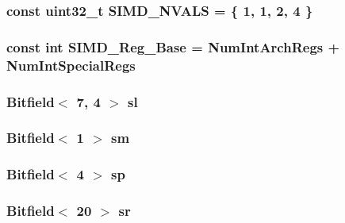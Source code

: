 \label{namespaceMipsISA_ac6d349533fc98005c8ccf294db7b8033}
\hypertarget{namespaceMipsISA_a82c0828e33920777f7db2e172869fb4f}{
\subsubsection[{SIMD\_\-NVALS}]{\setlength{\rightskip}{0pt plus 5cm}const {\bf uint32\_\-t} {\bf SIMD\_\-NVALS} = \{ 1, 1, 2, 4 \}}}
\label{namespaceMipsISA_a82c0828e33920777f7db2e172869fb4f}
\hypertarget{namespaceMipsISA_aca56f2249a1261d2059a1197683c68db}{
\subsubsection[{SIMD\_\-Reg\_\-Base}]{\setlength{\rightskip}{0pt plus 5cm}const int {\bf SIMD\_\-Reg\_\-Base} = {\bf NumIntArchRegs} + {\bf NumIntSpecialRegs}}}
\label{namespaceMipsISA_aca56f2249a1261d2059a1197683c68db}
\hypertarget{namespaceMipsISA_a1c270fe7d427d315732ce89065669af0}{
\subsubsection[{sl}]{\setlength{\rightskip}{0pt plus 5cm}Bitfield$<$ 7, 4 $>$ {\bf sl}}}
\label{namespaceMipsISA_a1c270fe7d427d315732ce89065669af0}
\hypertarget{namespaceMipsISA_a54c7875eaf2634ca9f55701aee2a22e5}{
\subsubsection[{sm}]{\setlength{\rightskip}{0pt plus 5cm}Bitfield$<$ 1 $>$ {\bf sm}}}
\label{namespaceMipsISA_a54c7875eaf2634ca9f55701aee2a22e5}
\hypertarget{namespaceMipsISA_aec732cfc085807a8a81c2534c69cea56}{
\subsubsection[{sp}]{\setlength{\rightskip}{0pt plus 5cm}Bitfield$<$ 4 $>$ {\bf sp}}}
\label{namespaceMipsISA_aec732cfc085807a8a81c2534c69cea56}
\hypertarget{namespaceMipsISA_a1374386b07e211f084f2b05684c784c7}{
\subsubsection[{sr}]{\setlength{\rightskip}{0pt plus 5cm}Bitfield$<$ 20 $>$ {\bf sr}}}
